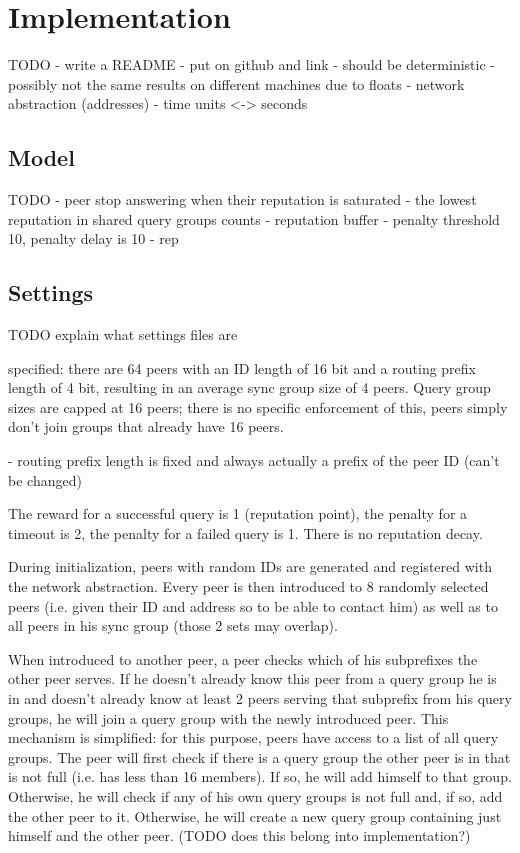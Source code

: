 \chapter{Implementation}
TODO
- write a README
- put on github and link
- should be deterministic
- possibly not the same results on different machines due to floats
- network abstraction (addresses)
- time units <-> seconds

\section{Model}
TODO
- peer stop answering when their reputation is saturated
- the lowest reputation in shared query groups counts
- reputation buffer
- penalty threshold 10, penalty delay is 10 - rep
\section{Settings}
TODO explain what settings files are

specified: there are 64 peers with an ID length of 16 bit and a routing prefix
length of 4 bit, resulting in an average sync group size of 4 peers. Query group
sizes are capped at 16 peers; there is no specific enforcement of this, peers
simply don't join groups that already have 16 peers.

- routing prefix length is fixed and always actually a prefix of the peer ID
  (can't be changed)

The reward for a successful query is 1 (reputation point), the penalty for a
timeout is 2, the penalty for a failed query is 1. There is no reputation decay.

During initialization, peers with random IDs are generated and registered with
the network abstraction. Every peer is then introduced to 8 randomly selected
peers (i.e. given their ID and address so to be able to contact him) as well as
to all peers in his sync group (those 2 sets may overlap).

When introduced to another peer, a peer checks which of his subprefixes the
other peer serves. If he doesn't already know this peer from a query group he is
in and doesn't already know at least 2 peers serving that subprefix from his
query groups, he will join a query group with the newly introduced peer. This
mechanism is simplified: for this purpose, peers have access to a list of all
query groups. The peer will first check if there is a query group the other peer
is in that is not full (i.e. has less than 16 members). If so, he will add
himself to that group. Otherwise, he will check if any of his own query groups
is not full and, if so, add the other peer to it. Otherwise, he will create a
new query group containing just himself and the other peer. (TODO does this
belong into implementation?)

